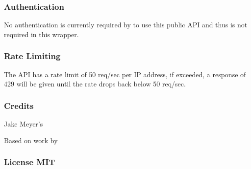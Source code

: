 \documentclass[letterpaper,10pt,english]{sphinxmanual}
\begin{document}
\subsubsection*{Authentication}

No authentication is currently required by  to use this public API and thus is not required in this wrapper.
\subsubsection*{Rate Limiting}

The API has a rate limit of 50 req/sec per IP
address, if exceeded, a response of 429 will be given until the rate drops back below 50 req/sec.
\subsubsection*{Credits}

Jake Meyer’s 

Based on work by 
\subsubsection*{License MIT}
\end{document}
